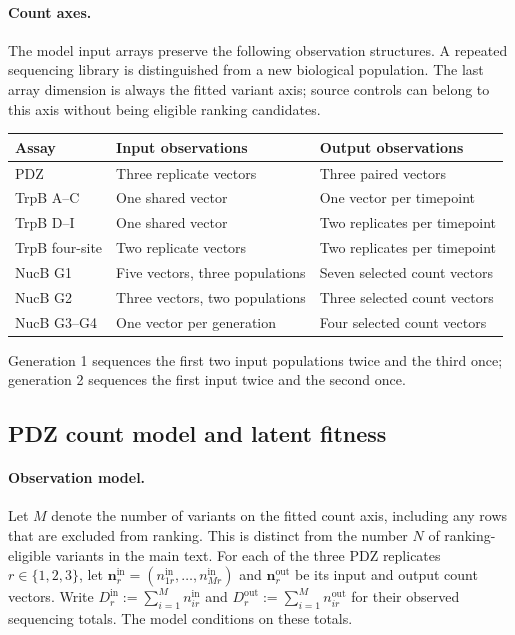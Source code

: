 \paragraph{Count axes.}
The model input arrays preserve the following observation structures. A
repeated sequencing library is distinguished from a new biological population.
The last array dimension is always the fitted variant axis; source controls
can belong to this axis without being eligible ranking candidates.
\begin{center}
\small
\begin{tabular}{lll}
\toprule
Assay & Input observations & Output observations \\
\midrule
PDZ & Three replicate vectors & Three paired vectors \\
TrpB A--C & One shared vector & One vector per timepoint \\
TrpB D--I & One shared vector & Two replicates per timepoint \\
TrpB four-site & Two replicate vectors & Two replicates per timepoint \\
NucB G1 & Five vectors, three populations & Seven selected count vectors \\
NucB G2 & Three vectors, two populations & Three selected count vectors \\
NucB G3--G4 & One vector per generation & Four selected count vectors \\
\bottomrule
\end{tabular}
\end{center}
Generation 1 sequences the first two input populations twice and the third
once; generation 2 sequences the first input twice and the second once.

\subsection{PDZ count model and latent fitness}
\label{app:pdz-model}

\paragraph{Observation model.}
Let $M$ denote the number of variants on the fitted count axis, including
any rows that are excluded from ranking. This is distinct from the number
$N$ of ranking-eligible variants in the main text. For each of the three
PDZ replicates $r\in\{1,2,3\}$, let
$\mathbf n_r^{\mathrm{in}}=(n_{1r}^{\mathrm{in}},\ldots,n_{Mr}^{\mathrm{in}})$
and $\mathbf n_r^{\mathrm{out}}$ be its input and output count vectors. Write
$D_r^{\mathrm{in}}:=\sum_{i=1}^M n_{ir}^{\mathrm{in}}$ and
$D_r^{\mathrm{out}}:=\sum_{i=1}^M n_{ir}^{\mathrm{out}}$ for their observed
sequencing totals. The model conditions on these totals.

